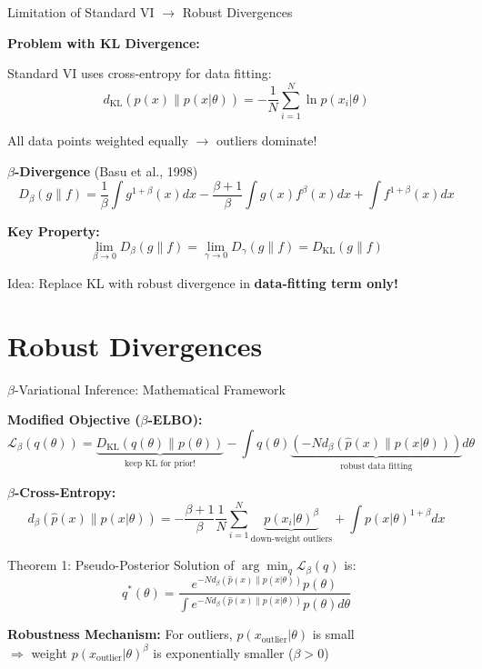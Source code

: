 \documentclass[aspectratio=169, 12pt]{beamer}
\begin{document}
\begin{frame}{Limitation of Standard VI \(\rightarrow\) Robust Divergences}

\textbf{Problem with KL Divergence:}

Standard VI uses cross-entropy for data fitting:
\[
d_{\text{KL}}(\hat{p}(x) \| p(x|\theta)) = -\frac{1}{N}\sum_{i=1}^N \ln p(x_i|\theta)
\]

\alert{All data points weighted equally} \(\rightarrow\) outliers dominate!

\vspace{0.4cm}

\textbf{\(\beta\)-Divergence} (Basu et al., 1998)
\[
D_\beta(g \| f) = \frac{1}{\beta}\int g^{1+\beta}(x)dx - \frac{\beta+1}{\beta}\int g(x)f^\beta(x)dx + \int f^{1+\beta}(x)dx
\]

\vspace{0.4cm}

\textbf{Key Property:}
\[
\lim_{\beta \to 0} D_\beta(g \| f) = \lim_{\gamma \to 0} D_\gamma(g \| f) = D_{\text{KL}}(g \| f)
\]

\alert{Idea:} Replace KL with robust divergence in \textbf{data-fitting term only!}

\end{frame}

\section{Robust Divergences}
\begin{frame}{$\beta$-Variational Inference: Mathematical Framework}

\textbf{Modified Objective ($\beta$-ELBO):}
\[
\mathcal{L}_\beta(q(\theta)) = \underbrace{D_{\text{KL}}(q(\theta) \| p(\theta))}_{\text{keep KL for prior!}} - \int q(\theta) \underbrace{\left(-N d_\beta(\hat{p}(x) \| p(x|\theta))\right)}_{\text{robust data fitting}} d\theta
\]

\vspace{0.3cm}

\textbf{$\beta$-Cross-Entropy:}
\[
d_\beta(\hat{p}(x) \| p(x|\theta)) = -\frac{\beta+1}{\beta}\frac{1}{N}\sum_{i=1}^N \underbrace{p(x_i|\theta)^\beta}_{\text{down-weight outliers}} + \int p(x|\theta)^{1+\beta}dx
\]

\vspace{0.3cm}

\begin{block}{Theorem 1: Pseudo-Posterior}
Solution of $\arg\min_q \mathcal{L}_\beta(q)$ is:
\[
q^*(\theta) = \frac{e^{-Nd_\beta(\hat{p}(x) \| p(x|\theta))}p(\theta)}{\int e^{-Nd_\beta(\hat{p}(x) \| p(x|\theta))}p(\theta)d\theta}
\]
\end{block}

\textbf{Robustness Mechanism:} For outliers, $p(x_{\text{outlier}}|\theta)$ is small \\
$\Rightarrow$ weight $p(x_{\text{outlier}}|\theta)^\beta$ is \alert{exponentially smaller} ($\beta > 0$)

\end{frame}
\end{document}
